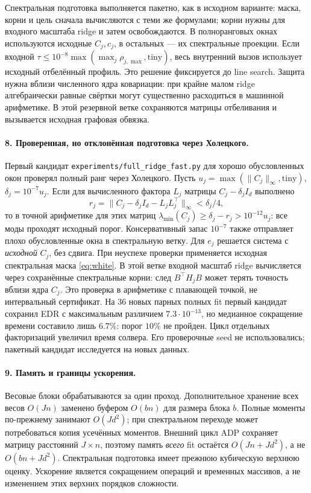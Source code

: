 \documentclass[11pt,a4paper]{article}
\newcommand{\norm}[1]{\lVert#1\rVert}
\newcommand{\code}[1]{\nolinkurl{#1}}
\begin{document}
Спектральная подготовка выполняется пакетно, как в исходном варианте:
маска, корни и цель сначала вычисляются с теми же формулами; корни нужны
для входного масштаба ridge и затем освобождаются. В полноранговых окнах
используются исходные $C_j,c_j$, в остальных --- их спектральные проекции.
Если входной $\tau\le10^{-8}\max(\max_j\rho_{j,\max},\mathrm{tiny})$,
весь внутренний вызов использует исходный отбелённый профиль. Это решение
фиксируется до line search. Защита нужна вблизи численного ядра ковариации:
при крайне малом ridge алгебраически равные свёртки могут существенно
расходиться в машинной арифметике. В этой резервной ветке сохраняются
матрицы отбеливания и вызывается исходная графовая обвязка.

\paragraph{8. Проверенная, но отклонённая подготовка через Холецкого.}
Первый кандидат \code{experiments/full_ridge_fast.py}
для хорошо обусловленных окон проверял полный ранг через Холецкого.
Пусть $u_j=\max(\norm{C_j}_\infty,\mathrm{tiny})$,
$\delta_j=10^{-7}u_j$. Если для вычисленного фактора $L_j$ матрицы
$C_j-\delta_jI_d$ выполнено
\[
 r_j=\norm{C_j-\delta_jI_d-L_jL_j^\top}_\infty<\delta_j/4,
\]
то в точной арифметике для этих матриц
$\lambda_{\min}(C_j)\ge\delta_j-r_j>10^{-12}u_j$:
все моды проходят исходный порог. Консервативный запас $10^{-7}$
также отправляет плохо обусловленные окна в спектральную ветку.
Для $e_j$ решается система с \emph{исходной} $C_j$, без сдвига.
При неуспехе проверки применяется исходная спектральная маска
\eqref{eq:white}. В этой ветке входной масштаб ridge вычисляется через
сохранённые спектральные корни: след $B^\top H_jB$ может терять точность
вблизи ядра $C_j$. Это проверка в арифметике с плавающей точкой,
не интервальный сертификат. На 36 новых парных полных fit первый кандидат
сохранил EDR с максимальным различием $7.3\cdot10^{-13}$, но медианное
сокращение времени составило лишь $6.7\%$: порог $10\%$ не пройден.
Цикл отдельных факторизаций увеличил время солвера. Его проверочные seed
не использовались; пакетный кандидат исследуется на новых данных.

\paragraph{9. Память и границы ускорения.}
Весовые блоки обрабатываются за один проход. Дополнительное хранение
всех весов $O(Jn)$ заменено буфером $O(bn)$ для размера блока $b$.
Полные моменты по-прежнему занимают $O(Jd^2)$; при спектральном переходе
может потребоваться копия усечённых моментов. Внешний цикл ADP сохраняет
матрицу расстояний $J\times n$, поэтому память \emph{всего} fit остаётся
$O(Jn+Jd^2)$, а не $O(bn+Jd^2)$. Спектральная подготовка имеет прежнюю
кубическую верхнюю оценку. Ускорение является сокращением операций и
временных массивов, а не изменением этих верхних порядков сложности.
\end{document}
